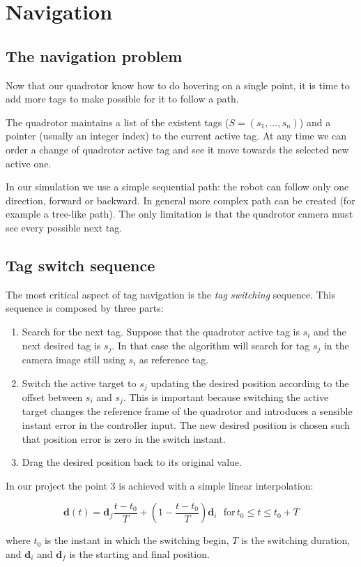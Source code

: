 \section{Navigation}

\subsection{The navigation problem}

Now that our quadrotor know how to do hovering on a single point, it is time to
add more tags to make possible for it to follow a path.

The quadrotor maintains a list of the existent tags ($S = (s_1,...,s_n)$) and
a pointer (usually an integer index) to the current active tag. At any time we
can order a change of quadrotor active tag and see it move towards the selected
new active one.

In our simulation we use a simple sequential path: the robot can follow only
one direction, forward or backward. In general more complex path can be created
(for example a tree-like path). The only limitation is that the quadrotor
camera must see every possible next tag.

\subsection{Tag switch sequence}

The most critical aspect of tag navigation is the \emph{tag switching}
sequence. This sequence is composed by three parts:

\begin{enumerate}
    \item Search for the next tag. Suppose that the quadrotor active tag is
        $s_i$ and the next desired tag is $s_j$. In that case the algorithm
        will search for tag $s_j$ in the camera image still using $s_i$ as
        reference tag.
    \item Switch the active target to $s_j$ updating the desired position
        according to the offset between $s_i$ and $s_j$. This is important
        because switching the active target changes the reference frame of the
        quadrotor and introduces a sensible instant error in the controller
        input. The new desired position is chosen such that position error is
        zero in the switch instant.
    \item Drag the desired position back to its original value.
\end{enumerate}

In our project the point 3 is achieved with a simple linear interpolation:

\begin{equation}
    \boldsymbol{d}(t) = \boldsymbol{d}_f \frac{t-t_0}{T} + (1-\frac{t-t_0}{T})\boldsymbol{d}_i\:\:\: \text{for}\, t_0 \le t \le t_0+T
\end{equation}

where $t_0$ is the instant in which the switching begin, $T$ is the switching
duration, and $\boldsymbol{d}_i$ and $\boldsymbol{d}_f$ is the starting and
final position.
